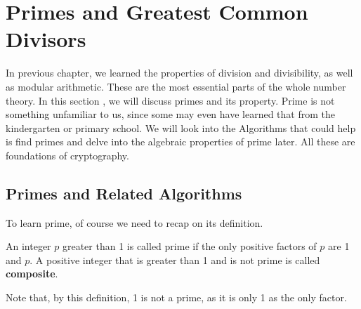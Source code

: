 \section{Primes and Greatest Common Divisors}
        In previous chapter, we learned the properties of division and divisibility, as well as
        modular arithmetic. These are the most essential parts of the whole number theory. In this section
        , we will discuss primes and its property. Prime is not something unfamiliar to us, since some may
        even have learned that from the kindergarten or primary school. We will look into the Algorithms
        that could help is find primes and delve into the algebraic properties of prime later. All these
        are foundations of cryptography.
    \subsection{Primes and Related Algorithms}
        To learn prime, of course we need to recap on its definition.
        \begin{definition}  
            An integer $p$ greater than 1 is called prime if the only positive factors of $p$ are 1 and $p$.
            A positive integer that is greater than 1 and is not prime is called \textbf{composite}.
        \end{definition}    
        Note that, by this definition, 1 is not a prime, as it is only 1 as the only factor.

